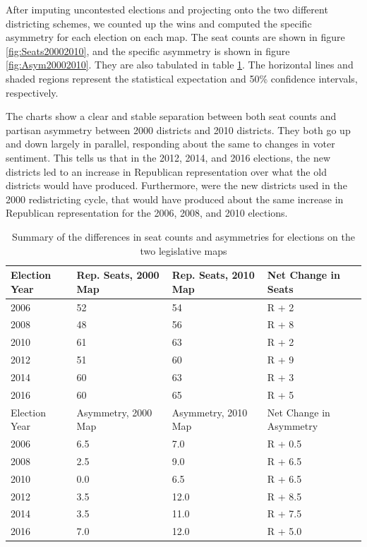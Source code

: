 \documentclass[preprint,12pt]{article}
\begin{document}
After imputing uncontested elections and projecting onto the two different districting schemes, we counted up the wins and computed the specific asymmetry for each election on each map.
The seat counts are shown in figure \ref{fig:Seats20002010}, and the specific asymmetry is shown in figure \ref{fig:Asym20002010}.  They are also tabulated in table \ref{tab:seats}.
The horizontal lines and shaded regions represent the statistical expectation and 50\% confidence intervals, respectively.

The charts show a clear and stable separation between both seat counts and partisan asymmetry between 2000 districts and 2010 districts.
They both go up and down largely in parallel, responding about the same to changes in voter sentiment.
This tells us that in the 2012, 2014, and 2016 elections, the new districts led to an increase in Republican representation over what the old districts would have produced.
Furthermore, were the new districts used in the 2000 redistricting cycle, that would have produced about the same increase in Republican representation for the 2006, 2008, and 2010 elections.

\begin{table}[htb!]
\centering
\caption{Summary of the differences in seat counts and asymmetries for elections on the two legislative maps \label{tab:seats}}
\begin{tabular}{|l|l|l|l|}
\hline
Election Year & Rep. Seats, 2000 Map & Rep. Seats, 2010 Map & Net Change in Seats\\
\hline
\hline
2006 & 52 & 54 & R + 2\\
\hline
2008 & 48 & 56 & R + 8\\
\hline
2010 & 61 & 63 & R + 2\\
\hline
2012 & 51 & 60 & R + 9\\
\hline
2014 & 60 & 63 & R + 3\\
\hline
2016 & 60 & 65 & R + 5\\
\hline
\hline
Election Year & Asymmetry, 2000 Map & Asymmetry, 2010 Map & Net Change in Asymmetry\\
\hline
\hline
2006 & 6.5 & 7.0 & R + 0.5\\
\hline
2008 & 2.5 & 9.0 & R + 6.5\\
\hline
2010 & 0.0 & 6.5 & R + 6.5\\
\hline
2012 & 3.5 & 12.0 & R + 8.5\\
\hline
2014 & 3.5 & 11.0 & R + 7.5\\
\hline
2016 & 7.0 & 12.0 & R + 5.0\\
\hline
\end{tabular}
\end{table}
\end{document}
